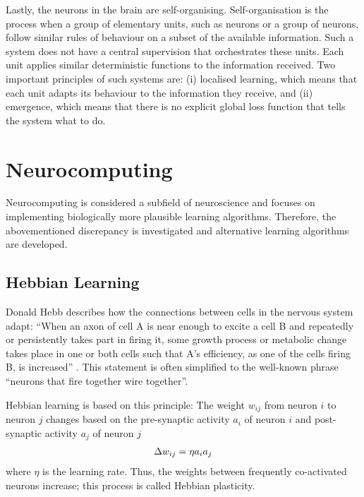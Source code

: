 Lastly, the neurons in the brain are self-organising.
Self-organisation is the process when a group of elementary units, such as neurons or a group of neurons, follow similar rules of behaviour on a subset of the available information.
Such a system does not have a central supervision that orchestrates these units.
Each unit applies similar deterministic functions to the information received.
Two important principles of such systems are: (i) localised learning, which means that each unit adapts its behaviour to the information they receive, and (ii) emergence, which means that there is no explicit global loss function that tells the system what to do.


\section{Neurocomputing}
Neurocomputing is considered a subfield of neuroscience and focuses on implementing biologically more plausible learning algorithms. Therefore, the abovementioned discrepancy is investigated and alternative learning algorithms are developed.

\subsection{Hebbian Learning}
Donald Hebb describes how the connections between cells in the nervous system adapt: ``When an axon of cell A is near enough to excite a cell B and repeatedly or persistently takes part in firing it, some growth process or metabolic change takes place in one or both cells such that A's efficiency, as one of the cells firing B, is increased'' . This statement is often simplified to the well-known phrase ``neurons that fire together wire together''.

Hebbian learning is based on this principle:
The weight $w_{ij}$ from neuron $i$ to neuron $j$ changes based on the pre-synaptic activity $a_i$ of neuron $i$ and post-synaptic activity $a_j$ of neuron $j$
%
\begin{align}\eqlbl{hebb_1}
	\Delta w_{ij} = \eta a_i a_j
\end{align}
%
where \(\eta\) is the learning rate.
Thus, the weights between frequently co-activated neurons increase; this process is called Hebbian plasticity.

